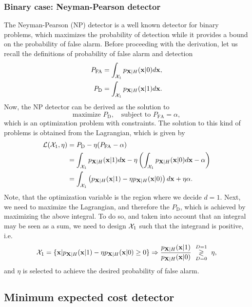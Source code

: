 \subsubsection{Binary case: Neyman-Pearson detector}

The Neyman-Pearson (NP) detector is a well known detector for binary problems, which maximizes the probability of detection while it provides a bound on the probability of false alarm. Before proceeding with the derivation, let us recall the definitions of probability of false alarm and detection
\begin{align}
P_\text{FA} & = \int_{{\cal X}_1} p_{{\bf X}|H}({\bf x}|0) d{\bf x}, \nonumber \\
P_\text{D} & = \int_{{\cal X}_1} p_{{\bf X}|H}({\bf x}|1) d{\bf x}. \nonumber
\end{align}
Now, the NP detector can be derived as the solution to
\begin{equation*}
	\text{maximize } P_\text{D}, \quad \text{subject to } P_\text{FA} = \alpha,
\end{equation*}
which is an optimization problem with constraints. The solution to this kind of problems is obtained from the Lagrangian, which is given by
\begin{align}
\mathcal{L}(\mathcal{X}_1,\eta) &= P_\text{D} - \eta (P_\text{FA} - \alpha) \nonumber \\
&= \int_{{\cal X}_1} p_{{\bf X}|H}({\bf x}|1) d{\bf x}  - \eta \left(\int_{{\cal X}_1} p_{{\bf X}|H}({\bf x}|0) d{\bf x} - \alpha \right) \nonumber \\
&= \int_{\mathcal{X}_1} \left( p_{{\bf X}|H}({\bf x}|1) - \eta p_{{\bf X}|H}({\bf x}|0)  \right) d  {\bf x} + \eta \alpha. \nonumber
\end{align}
Note, that the optimization variable is the region where we decide $d=1$. Next, we need to maximize the Lagrangian, and therefore the $P_\text{D}$, which is achieved by maximizing the above integral. To do so, and taken into account that an integral may be seen as a sum, we need to design ${\cal X}_1$ such that the integrand is positive, i.e.
\begin{equation*}
	\mathcal{X}_1 = \{\mathbf{x} |p_{{\bf X}|H}({\bf x}|1) - \eta p_{{\bf X}|H}({\bf x}|0) \geq 0 \} \Rightarrow \frac{p_{{\bf X}|H}({\bf x}|1)}{p_{{\bf X}|H}({\bf x}|0)} \,\, \underset{D=0}{\overset{D=1}{\gtrless}}\,\, \eta,
\end{equation*}
and $\eta$ is selected to achieve the desired probability of false alarm.

\subsection{Minimum expected cost detector}

